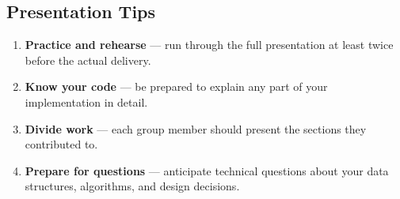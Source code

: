 \subsection{Presentation Tips}

\begin{enumerate}
  \item \textbf{Practice and rehearse} --- run through the full presentation at least twice before the actual delivery.
  \item \textbf{Know your code} --- be prepared to explain any part of your implementation in detail.
  \item \textbf{Divide work} --- each group member should present the sections they contributed to.
  \item \textbf{Prepare for questions} --- anticipate technical questions about your data structures, algorithms, and design decisions.
\end{enumerate}
